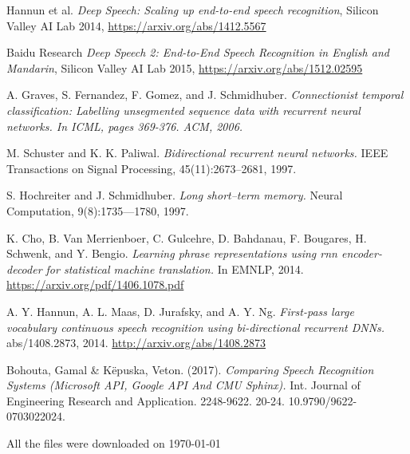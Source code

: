 \documentclass[licencjacka,en]{pracamgr}
\newcommand{\bibDownloadDate}{\today}
\begin{document}
\begin{thebibliography}{99}

 Hannun et al. 
\textit{Deep Speech: Scaling up end-to-end speech recognition}, Silicon Valley AI Lab 2014, \href{https://arxiv.org/abs/1412.5567}{https://arxiv.org/abs/1412.5567}
  
 Baidu Research \textit{Deep Speech 2: End-to-End Speech Recognition in English and Mandarin}, Silicon Valley AI Lab 2015, \href{https://arxiv.org/abs/1512.02595}{https://arxiv.org/abs/1512.02595}

 A. Graves, S. Fernandez, F. Gomez, and J. Schmidhuber. \textit{Connectionist temporal classification:
Labelling unsegmented sequence data with recurrent neural networks. In ICML, pages 369-376. ACM, 2006.}

 M. Schuster and K. K. Paliwal. \textit{Bidirectional recurrent neural networks.} IEEE Transactions on Signal Processing, 45(11):2673–2681, 1997.

 S. Hochreiter and J. Schmidhuber. \textit{Long short--term memory.} Neural Computation, 9(8):1735—1780, 1997.

 K. Cho, B. Van Merrienboer, C. Gulcehre, D. Bahdanau, F. Bougares, H. Schwenk, and Y. Bengio. \textit{Learning phrase representations using rnn encoder-decoder for statistical machine translation.} In EMNLP, 2014. \href{https://arxiv.org/pdf/1406.1078.pdf}{https://arxiv.org/pdf/1406.1078.pdf}

 A. Y. Hannun, A. L. Maas, D. Jurafsky, and A. Y. Ng. \textit{First-pass large vocabulary continuous speech recognition using bi-directional recurrent DNNs.} abs/1408.2873, 2014. \href{http://arxiv.org/abs/1408.2873}{http://arxiv.org/abs/1408.2873}

 Bohouta, Gamal \& Këpuska, Veton. (2017). \textit{Comparing Speech Recognition Systems (Microsoft API, Google API And CMU Sphinx).} Int. Journal of Engineering Research and Application. 2248-9622. 20-24. 10.9790/9622-0703022024.

\end{thebibliography}
All the files were downloaded on \bibDownloadDate
\end{document}
